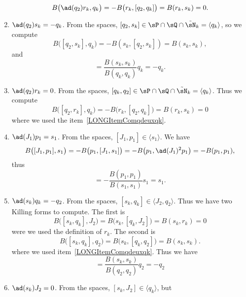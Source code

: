 \begin{enumerate}
		\begin{equation}
			B\big( \ad(q_2)r_k,q_k \big)=-B\big( r_k,[q_2,q_k] \big)=B(r_k,s_k)=0.
		\end{equation}
	\item$\ad(q_2)s_k=-q_k$. From the spaces, $[q_2,s_k]\in\sP\cap\sQ\cap\tilde\sN_k=\langle q_k\rangle$, so we compute
		\begin{equation}
			B\big( [q_2,s_k],q_k \big)=-B(s_k,[q_2,s_k])=B(s_k,s_k),
		\end{equation}
		and
		\begin{equation}
			[q_2,s_k]=\frac{ B(s_k,s_k) }{ B(q_k,q_k) }q_k=-q_k.
		\end{equation}
	\item$\ad(q_2)r_k=0$. From the spaces, $[q_k,q_2]\in\sP\cap\sQ\cap\tilde\sN_k=\langle q_k\rangle$. Thus we compute
		\begin{equation}
			B\big( [q_2,r_k],q_k \big)=-B\big( r_k,[q_2,q_k] \big)=B(r_k,s_k)=0
		\end{equation}
		where we used the item~\ref{LONGItemComqdeuxqk}.
	\item\label{LONGItemComjunpun}$\ad(J_1)p_1=s_1$. From the spaces, $[J_1,p_1]\in\langle s_1\rangle$. We have
		\begin{equation}
			B\big( [J_1,p_1],s_1 \big)=-B\big( p_1,[J_1,s_1] \big)=-B\big( p_1,\ad(J_1)^2p_1 \big)=-B(p_1,p_1),
		\end{equation}
		thus
		\begin{equation}
			[J_1,p_1]=-\frac{ B(p_1,p_1) }{ B(s_1,s_1) }s_1=s_1.
		\end{equation}
	\item\label{LONGItemComskqk}$\ad(s_k)q_k=-q_2$. From the spaces, $[s_k,q_k]\in\langle J_2,q_2\rangle$. Thus we have two Killing forms to compute. The first is
		\begin{equation}
			B\big( [s_k,q_k],J_2 \big)=B\big( s_k,[q_k,J_2] \big)=B(s_k,r_k)=0
		\end{equation}
		were we used the definition of $r_k$. The second is
		\begin{equation}
			B\big( [s_k,q_k],q_2 \big)=B\big( s_k,[q_k,q_2] \big)=B(s_k,s_k).
		\end{equation}
		where we used item~\ref{LONGItemComqdeuxqk}. Thus we have
		\begin{equation}
			[s_k,q_k]=\frac{ B(s_k,s_k) }{ B(q_2,q_2) }q_2=-q_2
		\end{equation}
	\item$\ad(s_k)J_2=0$. From the spaces, $[s_k,J_2]\in\langle q_k\rangle$, but

\end{enumerate}
